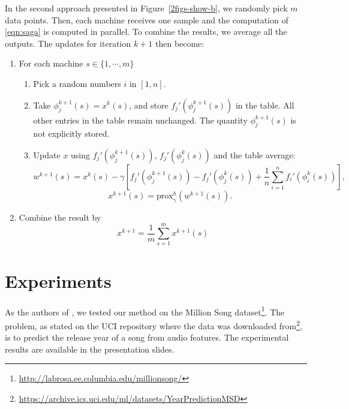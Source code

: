 \documentclass[a4paper,11pt]{article}
\newcommand{\prox}{\textrm{prox}}
\begin{document}
In the second approach presented in Figure~\ref{2figs-show-b}, we randomly pick $m$ data points. Then, each machine receives one sample and the computation of \eqref{eqn:saga} is computed in parallel. To combine the results, we average all the outputs. The updates for iteration $k+1$ then become:
\begin{enumerate}	
	\item For each machine $s \in \{ 1, \cdots, m \}$
	\begin{enumerate}
		\item Pick a random numbers $i$ in $[1, n]$.
		\item Take $\phi_j^{k+1}(s) = x^k(s)$, and store $f_j'(\phi_j^{k+1}(s))$ in the table.
		All other entries in the table remain unchanged. The quantity $\phi_j^{k+1}(s)$
		is not explicitly stored.
		\item Update $x$ using $f_j'(\phi_j^{k+1}(s))$, $f_j'(\phi_j^k(s))$ and the table
		average:
		\begin{equation}
		w^{k+1}(s) = x^k(s) - \gamma \left[ f_j'(\phi_j^{k+1}(s)) - f_j'(\phi_j^k(s))
		+ \frac1n \sum_{i=1}^n f_i'(\phi_i^k(s)) \right] ,
		\end{equation}
		$$x^{k+1}(s) = \prox_\gamma^h (w^{k+1}(s)).$$
	\end{enumerate}
	\item Combine the result by
	$$ x^{k+1} = \frac{1}{m} \sum_{s=1}^m x^{k+1}(s) $$
\end{enumerate}

\section{Experiments}
As the authors of \cite{defazio_saga_2014}, we tested our method on the Million
Song dataset\footnote{\url{http://labrosa.ee.columbia.edu/millionsong/}}. The
problem, as stated on the UCI repository where the data was downloaded
from\footnote{\url{https://archive.ics.uci.edu/ml/datasets/YearPredictionMSD}},
is to predict the release year of a song from audio features. The experimental results are available in the presentation slides.

%

\printbibliography
\end{document}
